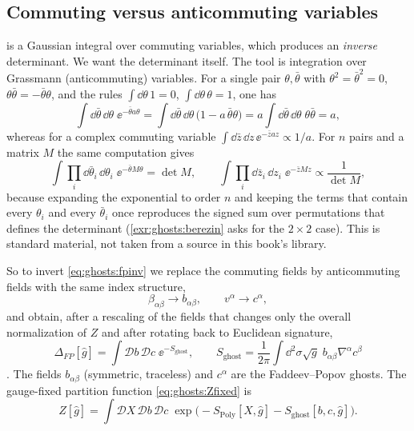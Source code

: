\subsection{Commuting versus anticommuting variables}

 is a Gaussian integral over commuting variables, which produces an
\emph{inverse} determinant. We want the determinant itself. The tool is integration over
Grassmann (anticommuting) variables. For a single pair
$\theta,\bar\theta$ with $\theta^2=\bar\theta^2=0$, $\theta\bar\theta=-\bar\theta\theta$, and the
rules $\int\dd\theta\,1=0$, $\int\dd\theta\,\theta=1$, one has
\[
  \int\dd\bar\theta\,\dd\theta\;\ee^{-\bar\theta a\theta}
  =\int\dd\bar\theta\,\dd\theta\,\bigl(1-a\,\bar\theta\theta\bigr)
  =a\int\dd\bar\theta\,\dd\theta\;\theta\bar\theta = a ,
\]
whereas for a complex commuting variable
$\int\dd\bar z\,\dd z\,\ee^{-\bar z a z}\propto 1/a$. For $n$ pairs and a matrix $M$ the same
computation gives
\begin{equation}\label{eq:ghosts:berezin}
  \int\prod_i\dd\bar\theta_i\,\dd\theta_i\;\ee^{-\bar\theta M\theta}=\det M,
  \qquad
  \int\prod_i\dd\bar z_i\,\dd z_i\;\ee^{-\bar z M z}\propto\frac{1}{\det M},
\end{equation}
because expanding the exponential to order $n$ and keeping the terms that contain every
$\theta_i$ and every $\bar\theta_i$ once reproduces the signed sum over permutations that
defines the determinant (\cref{exr:ghosts:berezin} asks for the $2\times2$ case). This is
standard material, not taken from a source in this book's library.

So to invert \cref{eq:ghosts:fpinv} we replace the commuting fields by anticommuting fields
with the same index structure,
\[
  \beta_{\alpha\beta}\longrightarrow b_{\alpha\beta},\qquad v^\alpha\longrightarrow c^\alpha ,
\]
and obtain, after a rescaling of the fields that changes only the overall normalization of
$Z$ and after rotating back to Euclidean signature,
\begin{equation}\label{eq:ghosts:Sghost}
  \Delta_{FP}[\hat g]=\int\mathcal Db\,\mathcal Dc\;\ee^{-S_{\mathrm{ghost}}},\qquad
  S_{\mathrm{ghost}}=\frac{1}{2\pi}\int\dd^2\sigma\sqrt{g}\;b_{\alpha\beta}\nabla^\alpha c^\beta
\end{equation}
. The fields $b_{\alpha\beta}$ (symmetric, traceless)
and $c^\alpha$ are the Faddeev--Popov ghosts.
The gauge-fixed partition function \cref{eq:ghosts:Zfixed} is
\begin{equation}\label{eq:ghosts:Zfull}
  Z[\hat g]=\int\mathcal DX\,\mathcal Db\,\mathcal Dc\;
  \exp\bigl(-S_{\mathrm{Poly}}[X,\hat g]-S_{\mathrm{ghost}}[b,c,\hat g]\bigr).
\end{equation}

